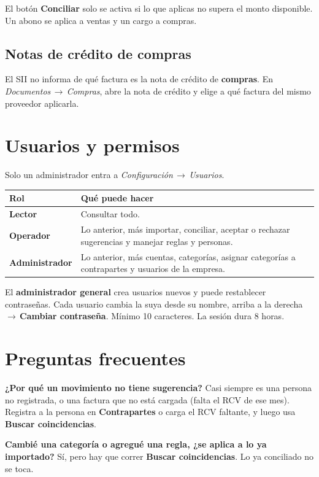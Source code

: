 \documentclass[11pt,a4paper]{article}
\newcommand{\ui}[1]{\textsf{\textbf{#1}}}                       %
\newcommand{\ruta}[1]{\textsf{\textit{#1}}}                      %
\newcommand{\flecha}{\,$\rightarrow$\,}
\newcommand{\encabezado}[1]{\sffamily\bfseries #1}
\begin{document}
El botón \ui{Conciliar} solo se activa si lo que aplicas no supera el monto disponible. Un abono se aplica a ventas y un cargo a compras.

\subsection*{Notas de crédito de compras}
El SII no informa de qué factura es la nota de crédito de \textbf{compras}. En \ruta{Documentos\flecha Compras}, abre la nota de crédito y elige a qué factura del mismo proveedor aplicarla.

\section{Usuarios y permisos}

Solo un administrador entra a \ruta{Configuración\flecha Usuarios}.

\begin{tabularx}{\textwidth}{@{}>{\sffamily\bfseries}p{3cm}Y@{}}
\toprule
{}\encabezado{Rol} & \encabezado{Qué puede hacer}\\
\midrule
Lector & Consultar todo.\\
Operador & Lo anterior, más importar, conciliar, aceptar o rechazar sugerencias y manejar reglas y personas.\\
Administrador & Lo anterior, más cuentas, categorías, asignar categorías a contrapartes y usuarios de la empresa.\\
\bottomrule
\end{tabularx}

El \textbf{administrador general} crea usuarios nuevos y puede restablecer contraseñas. Cada usuario cambia la suya desde su nombre, arriba a la derecha\flecha \ui{Cambiar contraseña}. Mínimo 10 caracteres. La sesión dura 8 horas.

\section{Preguntas frecuentes}

\textbf{¿Por qué un movimiento no tiene sugerencia?} Casi siempre es una persona no registrada, o una factura que no está cargada (falta el RCV de ese mes). Registra a la persona en \ui{Contrapartes} o carga el RCV faltante, y luego usa \ui{Buscar coincidencias}.

\textbf{Cambié una categoría o agregué una regla, ¿se aplica a lo ya importado?} Sí, pero hay que correr \ui{Buscar coincidencias}. Lo ya conciliado no se toca.
\end{document}
